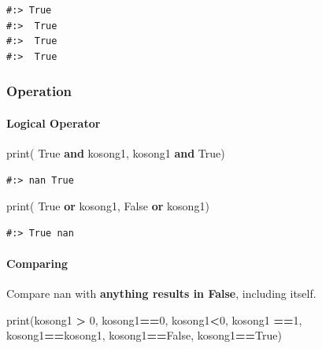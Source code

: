 \documentclass[
]{book}
\newenvironment{Shaded}{\begin{snugshade}}{\end{snugshade}}
\newcommand{\BuiltInTok}[1]{#1}
\newcommand{\DecValTok}[1]{\textcolor[rgb]{0.06,0.06,0.06}{#1}}
\newcommand{\KeywordTok}[1]{\textcolor[rgb]{0.27,0.27,0.27}{\textbf{#1}}}
\newcommand{\NormalTok}[1]{#1}
\newcommand{\OperatorTok}[1]{\textcolor[rgb]{0.43,0.43,0.43}{\textbf{#1}}}
\newcommand{\VariableTok}[1]{\textcolor[rgb]{0,0,0}{#1}}
\begin{document}
\begin{verbatim}
#:> True 
#:>  True 
#:>  True 
#:>  True
\end{verbatim}

\hypertarget{operation}{%
\subsubsection{Operation}\label{operation}}

\hypertarget{logical-operator}{%
\paragraph{Logical Operator}\label{logical-operator}}

\begin{Shaded}
\begin{Highlighting}[]
\BuiltInTok{print}\NormalTok{( }\VariableTok{True} \KeywordTok{and}\NormalTok{ kosong1,}
\NormalTok{       kosong1 }\KeywordTok{and} \VariableTok{True}\NormalTok{)}
\end{Highlighting}
\end{Shaded}

\begin{verbatim}
#:> nan True
\end{verbatim}

\begin{Shaded}
\begin{Highlighting}[]
\BuiltInTok{print}\NormalTok{( }\VariableTok{True} \KeywordTok{or}\NormalTok{ kosong1,}
       \VariableTok{False} \KeywordTok{or}\NormalTok{ kosong1)}
\end{Highlighting}
\end{Shaded}

\begin{verbatim}
#:> True nan
\end{verbatim}

\hypertarget{comparing}{%
\paragraph{Comparing}\label{comparing}}

Compare nan with \textbf{anything results in False}, including itself.

\begin{Shaded}
\begin{Highlighting}[]
\BuiltInTok{print}\NormalTok{(kosong1 }\OperatorTok{>} \DecValTok{0}\NormalTok{, kosong1}\OperatorTok{==}\DecValTok{0}\NormalTok{, kosong1}\OperatorTok{<}\DecValTok{0}\NormalTok{,}
\NormalTok{      kosong1 }\OperatorTok{==}\DecValTok{1}\NormalTok{, kosong1}\OperatorTok{==}\NormalTok{kosong1, kosong1}\OperatorTok{==}\VariableTok{False}\NormalTok{, kosong1}\OperatorTok{==}\VariableTok{True}\NormalTok{)}
\end{Highlighting}
\end{Shaded}
\end{document}
